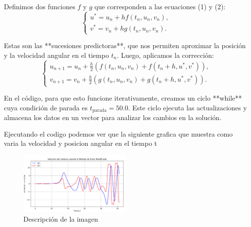 \documentclass{article}
\begin{document}
Definimos dos funciones $f$ y $g$ que corresponden a las ecuaciones (1) y (2):
\begin{equation}
    \begin{cases}
        u^* = u_n + h f(t_n, u_n, v_n),  \\
        v^* = v_n + h g(t_n, u_n, v_n).
    \end{cases}
\end{equation}

Estas son las **sucesiones predictoras**, que nos permiten aproximar la posición y la velocidad angular en el tiempo $t_n$. Luego, aplicamos la corrección:
\begin{equation}
    \begin{cases}
        u_{n+1} = u_n + \frac{h}{2} \left( f(t_n, u_n, v_n) + f(t_n + h, u^*, v^*) \right),  \\
        v_{n+1} = v_n + \frac{h}{2} \left( g(t_n, u_n, v_n) + g(t_n + h, u^*, v^*) \right).
    \end{cases}
\end{equation}

En el código, para que esto funcione iterativamente, creamos un ciclo **while** cuya condición de parada es $t_{\text{parada}} = 50.0$. Este ciclo ejecuta las actualizaciones y almacena los datos en un vector para analizar los cambios en la solución.

Ejecutando el codigo podemos ver que la siguiente grafica que muestra como varia la velocidad y posicion angular en el tiempo t

\begin{figure}[h]
    \centering
    \includegraphics[width=0.5\textwidth]{Captura.PNG}
    \caption{Descripción de la imagen}
    \label{fig:etiqueta}
\end{figure}
\end{document}
